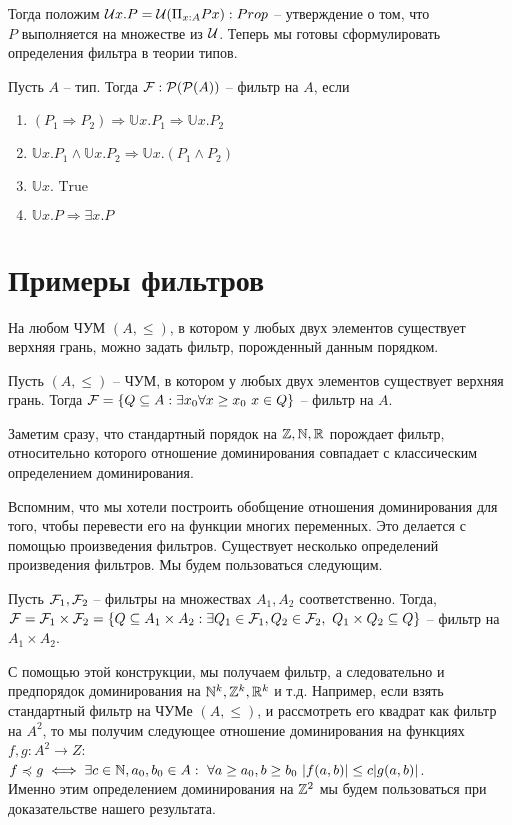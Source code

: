 Тогда положим $\mathcal{U} x.P = \mathcal{U} (\Pi_{x: A} P x): Prop$ -- утверждение о том, что \\ $P$ выполняется на множестве из $\mathcal{U}$. Теперь мы готовы сформулировать
определения фильтра в теории типов.
\begin{definition}
	Пусть $A$ -- тип. Тогда $\mathcal{F}: \mathcal{P}(\mathcal{P}(A))$ -- фильтр на $A$, если
	\begin{enumerate}
		\item $\left(P_{1} \Rightarrow P_{2}\right) \Rightarrow \mathbb{U} x . P_{1} \Rightarrow \mathbb{U} x . P_{2}$
		\item $\mathbb{U} x . P_{1} \wedge \mathbb{U} x . P_{2} \Rightarrow \mathbb{U} x .\left(P_{1} \wedge P_{2}\right)$
		\item $\mathbb{U} x . \text { True }$
		\item $\mathbb{U} x . P \Rightarrow \exists x . P$
	\end{enumerate}
\end{definition}
\section{Примеры фильтров}
На любом ЧУМ $(A, \leq)$, в котором у любых двух элементов существует верхняя грань, можно задать фильтр, порожденный данным порядком.
\begin{definition}
	Пусть $(A, \leq)$ -- ЧУМ, в котором у любых двух элементов существует верхняя грань.
	Тогда $\mathcal{F} = \{Q \subseteq A: \exists x_0 \forall x \geq x_0\ x \in Q\}$ -- фильтр на $A$.
\end{definition}
Заметим сразу, что стандартный порядок на $\mathbb{Z}, \mathbb{N}, \mathbb{R}$ порождает фильтр,
относительно которого отношение доминирования совпадает с классическим определением доминирования.
\par
Вспомним, что мы хотели построить обобщение отношения доминирования для того, чтобы перевести его на функции многих переменных. Это делается с помощью произведения
фильтров. Существует несколько определений произведения фильтров. Мы будем пользоваться следующим.
\begin{definition}
	Пусть $\mathcal{F}_1, \mathcal{F}_2$ -- фильтры на множествах $A_1, A_2$ соответственно. Тогда,
	$\mathcal{F} = \mathcal{F}_1 \times \mathcal{F}_2 = \{Q \subseteq A_1 \times A_2: \exists Q_1 \in \mathcal{F}_1, Q_2 \in \mathcal{F}_2,\ Q_1 \times Q_2 \subseteq Q\}$ -- фильтр на $A_1 \times A_2$.
\end{definition}
С помощью этой конструкции, мы получаем фильтр, а следовательно и предпорядок доминирования на $\mathbb{N}^k, \mathbb{Z}^k, \mathbb{R}^k$ и т.д.
Например, если взять стандартный фильтр на ЧУМе $(A, \leq)$, и рассмотреть его квадрат как фильтр на $A^2$, то мы получим следующее отношение доминирования
на функциях $f, g: A^2 \to Z$:\\
$f \preccurlyeq g \iff \exists c \in \mathbb{N}, a_0, b_0 \in A:\ \forall a \geq a_0, b \geq b_0\ |f(a, b)| \leq c|g(a, b)|$. \\
Именно этим определением доминирования на $\mathbb{Z}^2$ мы будем пользоваться при доказательстве нашего результата.

